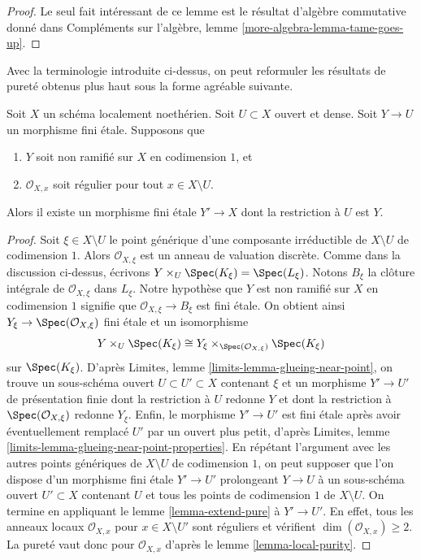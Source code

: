 \begin{proof}
Le seul fait intéressant de ce lemme est le résultat d'algèbre commutative
donné dans Compléments sur l'algèbre, lemme \ref{more-algebra-lemma-tame-goes-up}.
\end{proof}

\noindent
Avec la terminologie introduite ci-dessus, on peut reformuler les
résultats de pureté obtenus plus haut sous la forme agréable suivante.

\begin{lemma}
\label{lemma-purity-one-divisor-general}
Soit $X$ un schéma localement noethérien. Soit $U \subset X$ ouvert et dense.
Soit $Y \to U$ un morphisme fini \'etale. Supposons que
\begin{enumerate}
\item $Y$ soit non ramifié sur $X$ en codimension $1$, et
\item $\mathcal{O}_{X, x}$ soit régulier pour tout $x \in X \setminus U$.
\end{enumerate}
Alors il existe un morphisme fini \'etale $Y' \to X$
dont la restriction à $U$ est $Y$.
\end{lemma}

\begin{proof}
Soit $\xi \in X \setminus U$ le point générique d'une composante irréductible
de $X \setminus U$ de codimension $1$. Alors $\mathcal{O}_{X, \xi}$ est un
anneau de valuation discrète. Comme dans la discussion ci-dessus, écrivons
$Y \times_U \Spec(K_\xi) = \Spec(L_\xi)$.
Notons $B_\xi$ la clôture intégrale de $\mathcal{O}_{X, \xi}$ dans
$L_\xi$. Notre hypothèse que $Y$ est non ramifié sur $X$ en codimension $1$
signifie que $\mathcal{O}_{X, \xi} \to B_\xi$ est fini \'etale.
On obtient ainsi $Y_\xi \to \Spec(\mathcal{O}_{X, \xi})$ fini
\'etale et un isomorphisme
$$
Y \times_U \Spec(K_\xi) \cong
Y_\xi \times_{\Spec(\mathcal{O}_{X, \xi})} \Spec(K_\xi)
$$
sur $\Spec(K_\xi)$.
D'après Limites, lemme \ref{limits-lemma-glueing-near-point},
on trouve un sous-schéma ouvert $U \subset U' \subset X$
contenant $\xi$ et un morphisme $Y' \to U'$ de présentation finie
dont la restriction à $U$ redonne $Y$ et
dont la restriction à $\Spec(\mathcal{O}_{X, \xi})$ redonne $Y_\xi$.
Enfin, le morphisme $Y' \to U'$ est fini \'etale
après avoir éventuellement remplacé $U'$ par un ouvert plus petit, d'après
Limites, lemme \ref{limits-lemma-glueing-near-point-properties}.
En répétant l'argument avec les autres points génériques de
$X \setminus U$ de codimension $1$, on peut supposer que l'on dispose
d'un morphisme fini \'etale $Y' \to U'$ prolongeant $Y \to U$
à un sous-schéma ouvert $U' \subset X$ contenant $U$
et tous les points de codimension $1$ de $X \setminus U$.
On termine en appliquant le lemme \ref{lemma-extend-pure}
à $Y' \to U'$. En effet, tous les anneaux locaux $\mathcal{O}_{X, x}$
pour $x \in X \setminus U'$ sont réguliers et
vérifient $\dim(\mathcal{O}_{X, x}) \geq 2$. La pureté vaut donc
pour $\mathcal{O}_{X, x}$ d'après le lemme \ref{lemma-local-purity}.
\end{proof}

